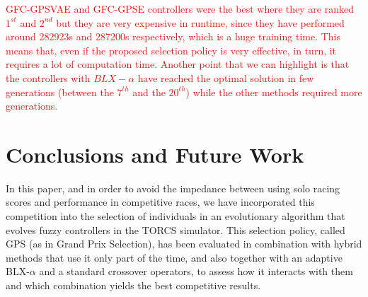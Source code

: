 \documentclass[10pt,journal,compsoc]{IEEEtran}
\begin{document}
\textcolor{red}{
{\sf GFC-GPSVAE} and {\sf GFC-GPSE} controllers were the best where
they are ranked $1^{st}$ and $2^{nd}$ but they are very expensive in runtime, since they have performed around 282923s and 287200s respectively, which is a
huge training time. %
This means that, even if the proposed selection policy is very effective, in turn, it requires a lot of computation time.
%
Another point that we can highlight is that the controllers with
$BLX-\alpha$ have reached the optimal solution in few generations
(between the $7^{th}$ and the $20^{th}$) while the other methods required more
generations. 
}
\section{Conclusions and Future Work} 
\label{sec:conclusions}

In this paper, and in order to avoid the impedance between using solo
racing scores and performance in competitive races, we have
incorporated this competition into the selection of individuals in an
evolutionary algorithm that evolves fuzzy controllers in the TORCS
simulator. This selection policy, called GPS (as in Grand Prix Selection), has been evaluated in combination with hybrid methods that use it only part of the time, and also together with an adaptive BLX-$\alpha$ and a standard crossover operators, to assess how it interacts with them and which combination yields the best competitive results.

\end{document}
